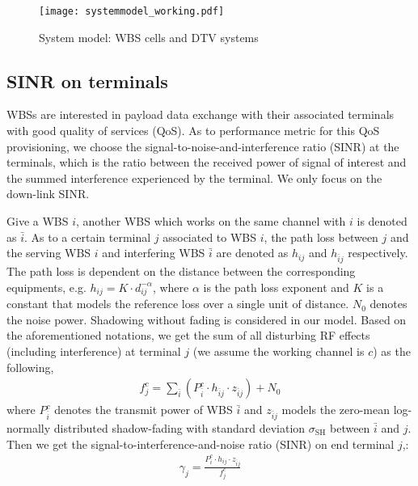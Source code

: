 \begin{figure}[h!]
  \centering
  \texttt{[image: systemmodel\_working.pdf]}
  \caption{System model: WBS cells and DTV systems}
\label{sysmodel}
\end{figure}

\subsection{SINR on terminals}
WBSs are interested in payload data exchange with their associated terminals with good quality of services (QoS). 
As to performance metric for this QoS provisioning, we choose the signal-to-noise-and-interference ratio (SINR) at the terminals, which is the ratio between the received power of signal of interest and the summed interference experienced by the terminal. 
We only focus on the down-link SINR. 

Give a WBS $i$, another WBS which works on the same channel with $i$ is denoted as $\bar{i}$.
As to a certain terminal $j$ associated to WBS $i$, the path loss between $j$ and the serving WBS $i$ and interfering WBS $\bar{i}$ are denoted as $h_{ij}$ and $h_{\bar{i}j}$ respectively.
The path loss is dependent on the distance between the corresponding equipments, e.g. $h_{ij}=K \cdot d_{ij}^{-\alpha}$, where $\alpha$ is the path loss exponent and $K$ is a constant that models the reference loss over a single unit of distance.  
$N_0$ denotes the noise power.
Shadowing without fading is considered in our model.
Based on the aforementioned notations, we get the sum of all disturbing RF effects (including interference) at terminal $j$ (we assume the working channel is $c$) as the following,
\begin{equation}
\label{interference}
\begin{aligned}
f_j^c=\sum_{\bar{i}} (P_{\bar{i}}^c \cdot h_{\bar{i}j} \cdot z_{\bar{i}j}) +  N_0
\end{aligned}
\end{equation}
where $P_{\bar{i}}^c$ denotes the transmit power of WBS $\bar{i}$ and $z_{\bar{i}j}$ models the zero-mean log-normally distributed shadow-fading with standard deviation $\sigma_{\text{SH}}$ between $\bar{i}$ and $j$.
Then we get the signal-to-interference-and-noise ratio (SINR) on end terminal $j$,:
\begin{equation}
\label{SINR}
\begin{aligned}
\gamma_{j} = \frac{P_{i}^c \cdot h_{ij}\cdot z_{\bar{i}j}} {f_j^c}
\end{aligned}
\end{equation}	




